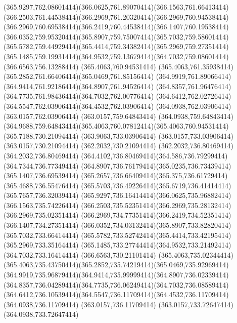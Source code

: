 {{	\curveto(365.9297,762.08601414)(366.0625,761.89070414)(366.1563,761.66413414)
	\curveto(366.2503,761.44538414)(366.2969,761.20320414)(366.2969,760.94538414)
	\curveto(366.2969,760.69538414)(366.2419,760.44538414)(366.1407,760.19538414)
	\curveto(366.0352,759.95320414)(365.8907,759.75007414)(365.7032,759.58601414)
	\curveto(365.5782,759.44929414)(365.4414,759.34382414)(365.2969,759.27351414)
	\curveto(365.1485,759.19931414)(364.9532,759.13679414)(364.7032,759.08601414)
	\lineto(366.6563,756.13288414)
	\closepath
	\moveto(365.4063,760.94531414)
	\curveto(365.4063,761.35938414)(365.2852,761.66406414)(365.0469,761.85156414)
	\curveto(364.9919,761.89066414)(364.9414,761.92186414)(364.8907,761.94526414)
	\curveto(364.8357,761.96476414)(364.7735,761.98436414)(364.7032,762.00776414)
	\curveto(364.6412,762.02726414)(364.5547,762.03906414)(364.4532,762.03906414)
	\lineto(364.0938,762.03906414)
	\lineto(363.0157,762.03906414)
	\lineto(363.0157,759.64843414)
	\lineto(364.0938,759.64843414)
	\curveto(364.9688,759.64843414)(365.4063,760.07812414)(365.4063,760.94531414)
	\closepath
	\moveto(365.7188,730.21094414)
	\lineto(363.9063,733.03906414)
	\lineto(363.0157,733.03906414)
	\lineto(363.0157,730.21094414)
	\lineto(362.2032,730.21094414)
	\lineto(362.2032,736.80469414)
	\lineto(364.2032,736.80469414)
	\curveto(364.4102,736.80469414)(364.586,736.79299414)(364.7344,736.77349414)
	\curveto(364.8907,736.76179414)(365.0235,736.73439414)(365.1407,736.69539414)
	\curveto(365.2657,736.66409414)(365.375,736.61729414)(365.4688,736.55476414)
	\curveto(365.5703,736.49226414)(365.6719,736.41414414)(365.7657,736.32039414)
	\curveto(365.9297,736.16414414)(366.0625,735.96882414)(366.1563,735.74226414)
	\curveto(366.2503,735.52351414)(366.2969,735.28132414)(366.2969,735.02351414)
	\curveto(366.2969,734.77351414)(366.2419,734.52351414)(366.1407,734.27351414)
	\curveto(366.0352,734.03132414)(365.8907,733.82820414)(365.7032,733.66414414)
	\curveto(365.5782,733.52742414)(365.4414,733.42195414)(365.2969,733.35164414)
	\curveto(365.1485,733.27744414)(364.9532,733.21492414)(364.7032,733.16414414)
	\lineto(366.6563,730.21101414)
	\closepath
	\moveto(365.4063,735.02344414)
	\curveto(365.4063,735.43750414)(365.2852,735.74219414)(365.0469,735.92969414)
	\curveto(364.9919,735.96879414)(364.9414,735.99999414)(364.8907,736.02339414)
	\curveto(364.8357,736.04289414)(364.7735,736.06249414)(364.7032,736.08589414)
	\curveto(364.6412,736.10539414)(364.5547,736.11709414)(364.4532,736.11709414)
	\lineto(364.0938,736.11709414)
	\lineto(363.0157,736.11709414)
	\lineto(363.0157,733.72647414)
	\lineto(364.0938,733.72647414)
}}

